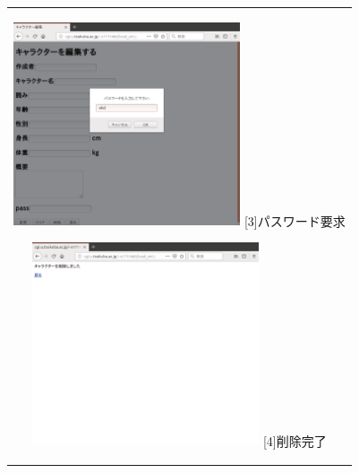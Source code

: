\documentclass[12pt,a4paper]{jarticle}
\begin{document}
\begin{ttfamily}
\begin{figure}[htbp]
\begin{center}
\begin{tabular}{c}
      \begin{minipage}{0.5\hsize}
        \begin{center}
          \includegraphics[width=6.7cm]{10-3-32.eps}
          \hspace{1.6cm} [3]パスワード要求
        \end{center}
      \end{minipage}

      \begin{minipage}{0.55\hsize}
        \begin{center}
          \includegraphics[width=6.7cm]{10-3-33.eps}
          \hspace{1.6cm} [4]削除完了
        \end{center}
      \end{minipage}

      \begin{minipage}{0.55\hsize}
        \vspace{90mm}
      \end{minipage} \\


\end{tabular}
\end{center}
\end{figure}
\end{ttfamily}
\end{document}
